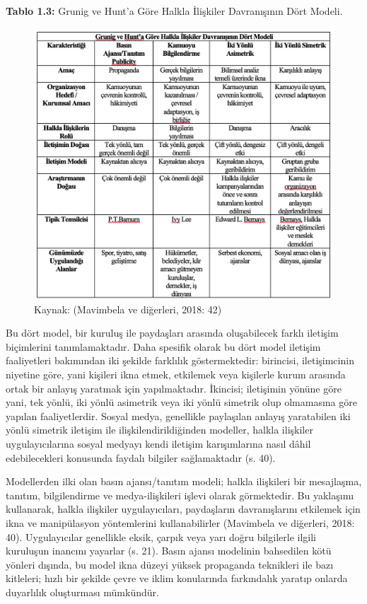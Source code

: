 \documentclass[
]{book}
\begin{document}
\textbf{Tablo 1.3:} Grunig ve Hunt'a Göre Halkla İlişkiler Davranışının Dört Modeli.

\begin{figure}
\includegraphics[width=0.95\linewidth,height=0.95\textheight]{tablolar-sekiller/tablo-1.3} \caption{Kaynak: (Mavimbela ve diğerleri, 2018: 42)}\label{fig:unnamed-chunk-2}
\end{figure}

Bu dört model, bir kuruluş ile paydaşları arasında oluşabilecek farklı iletişim biçimlerini tanımlamaktadır. Daha spesifik olarak bu dört model iletişim faaliyetleri bakımından iki şekilde farklılık göstermektedir: birincisi, iletişimcinin niyetine göre, yani kişileri ikna etmek, etkilemek veya kişilerle kurum arasında ortak bir anlayış yaratmak için yapılmaktadır. İkincisi; iletişimin yönüne göre yani, tek yönlü, iki yönlü asimetrik veya iki yönlü simetrik olup olmamasına göre yapılan faaliyetlerdir. Sosyal medya, genellikle paylaşılan anlayış yaratabilen iki yönlü simetrik iletişim ile ilişkilendirildiğinden modeller, halkla ilişkiler uygulayıcılarına sosyal medyayı kendi iletişim karışımlarına nasıl dâhil edebilecekleri konusunda faydalı bilgiler sağlamaktadır (s. 40). \citep{mavimbela2018perceived}

Modellerden ilki olan basın ajansı/tanıtım modeli; halkla ilişkileri bir mesajlaşma, tanıtım, bilgilendirme ve medya-ilişkileri işlevi olarak görmektedir. Bu yaklaşımı kullanarak, halkla ilişkiler uygulayıcıları, paydaşların davranışlarını etkilemek için ikna ve manipülasyon yöntemlerini kullanabilirler (Mavimbela ve diğerleri, 2018: 40). Uygulayıcılar genellikle eksik, çarpık veya yarı doğru bilgilerle ilgili kuruluşun inancını yayarlar (s. 21). \citep{grunig1984managing} Basın ajansı modelinin bahsedilen kötü yönleri dışında, bu model ikna düzeyi yüksek propaganda teknikleri ile bazı kitleleri; hızlı bir şekilde çevre ve iklim konularında farkındalık yaratıp onlarda duyarlılık oluşturması mümkündür.
\end{document}
